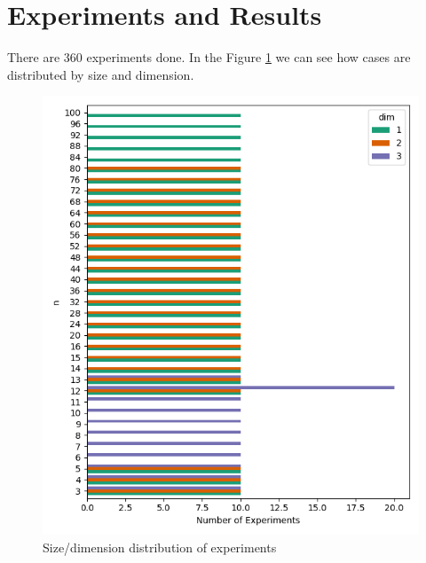 \documentclass{article}
\begin{document}
\section{Experiments and Results}
\par There are 360 experiments done. In the Figure \ref{fig:cases_distribution} we can see how cases are distributed by size and dimension.
\begin{figure}[ht]
  \centering
  \includegraphics[width=\textwidth]{pics/torus scores/cases.png}
  \caption{Size/dimension distribution of experiments}
  \label{fig:cases_distribution}
\end{figure}
\end{document}
